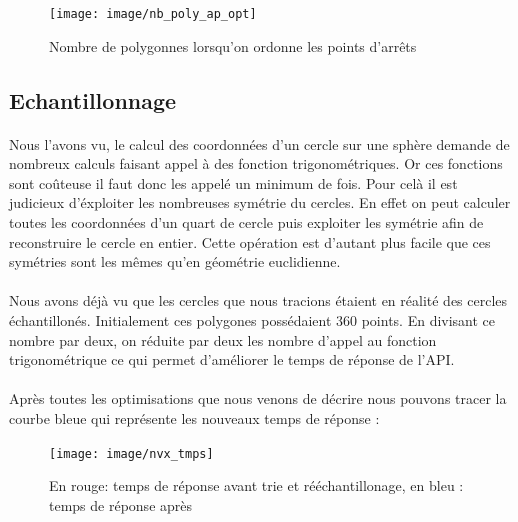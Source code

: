 \documentclass[a4paper]{report}
\begin{document}
\begin{figure}[H]
	\begin{center}
		\texttt{[image: image/nb\_poly\_ap\_opt]}
		\caption{Nombre de polygonnes lorsqu'on ordonne les points d'arrêts}
		\label{Nombre de polygonnes lorsqu'on ordonne les points d'arrêts}
	\end{center}
\end{figure}

\subsection{Echantillonnage}

\paragraph{} Nous l'avons vu, le calcul des coordonnées d'un cercle sur une sphère demande de nombreux calculs faisant appel à des fonction trigonométriques. Or ces fonctions sont coûteuse il faut donc les appelé un minimum de fois. Pour celà il est judicieux d'éxploiter les nombreuses symétrie du cercles. En effet on peut calculer toutes les coordonnées d'un quart de cercle puis exploiter les symétrie afin de reconstruire le cercle en entier. Cette opération est d'autant plus facile que ces symétries sont les mêmes qu'en géométrie euclidienne.

\paragraph{} Nous avons déjà vu que les cercles que nous tracions étaient en réalité des cercles échantillonés. Initialement ces polygones possédaient 360 points. En divisant ce nombre par deux, on réduite par deux les nombre d'appel au fonction trigonométrique ce qui permet d'améliorer le temps de réponse de l'API.

\paragraph{} Après toutes les optimisations que nous venons de décrire nous pouvons tracer la courbe bleue qui représente les nouveaux temps de réponse :

\begin{figure}[H]
	\begin{center}
		\texttt{[image: image/nvx\_tmps]}
		\caption{En rouge: temps de réponse avant trie et rééchantillonage, en bleu : temps de réponse après}
		\label{Temps de réponse après tri et rééchantillonnage}
	\end{center}
\end{figure}
\end{document}
